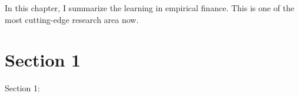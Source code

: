 \minitoc

\vspace{0.5cm}

In this chapter, I summarize the learning in empirical finance.
This is one of the most cutting-edge research area now.

\section{Section 1}
Section 1: